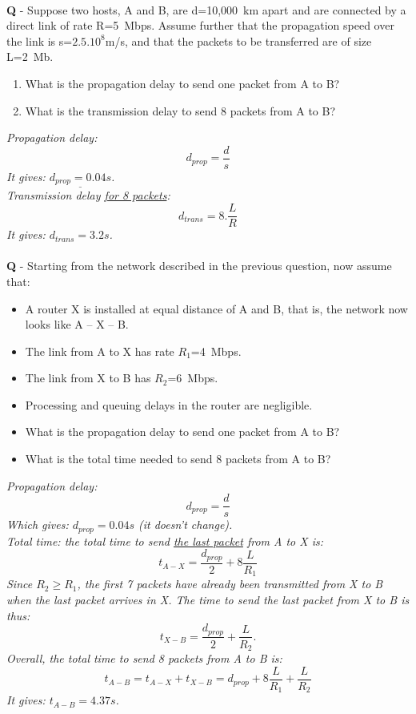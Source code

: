 \documentclass{llncs}
\newcounter{ques}
\newcommand{\quest}[2]{\paragraph{}\textbf{Q\theques} - #1\stepcounter{ques} }
\newcommand{\answer}[1]{\color{red}\textit{#1}\color{black}}
\begin{document}
\quest{Suppose two hosts, A and B, are d=10,000~km apart and are connected by a
  direct link of rate R=5~Mbps. Assume further that the propagation
  speed over the link is s=$2.5.10^8$m/s, and that the packets to be
  transferred are of size L=2~Mb.
  \begin{enumerate}
  \item What is the propagation delay to
    send one packet from A to B?
  \item What is the transmission delay to
    send 8 packets from A to B?
\end{enumerate}}{10}

\answer{
  Propagation delay:
  \begin{equation*}
    d_{prop}=\frac{d}{s}
  \end{equation*}
  It gives: $\underline{d_{prop}=0.04s}$.\\
  Transmission delay \underline{for 8 packets}:
  \begin{equation*}
    d_{trans} = 8.\frac{L}{R}
  \end{equation*}
  It gives: \underline{$d_{trans}= 3.2s$}.
}


\quest{Starting from the network described in the previous question, now assume that:
  \begin{itemize}
  \item A router X is installed at equal distance of A and B, that is, the network now looks like A -- X -- B.
  \item The link from A to X has rate $R_1$=4~Mbps.
  \item The link from X to B has $R_2$=6~Mbps.
  \item Processing and queuing delays in the router are negligible.
  \end{itemize}
  \begin{itemize}
  \item What is the propagation delay to send one packet from A to B?
  \item What is the total time needed to send 8 packets from A to B?
  \end{itemize}
}{10}

\answer{
  Propagation delay:
  \begin{equation*}
    d_{prop} =  \frac{d}{s}
  \end{equation*}
  Which gives: \underline{$d_{prop}=0.04s$} (it doesn't change).\\
  Total time: the total time to send \underline{the last packet} from A to X is:
  \begin{equation*}
    t_{A-X}=\frac{d_{prop}}{2}+8\frac{L}{R_1}
  \end{equation*}
  Since $R_2 \geq R_1$, the  first 7 packets have already been transmitted from X to B when the last packet arrives in X. The time to send the last packet from X to B is thus:
  \begin{equation*}
    t_{X-B}=\frac{d_{prop}}{2}+\frac{L}{R_2}.
  \end{equation*}
  Overall, the total time to send 8 packets from A to B is:
  \begin{equation*}
    t_{A-B}=t_{A-X}+t_{X-B}=d_{prop}+8\frac{L}{R_1}+\frac{L}{R_2}
  \end{equation*}
  It gives: \underline{$t_{A-B}=4.37s$}.
}
\end{document}
